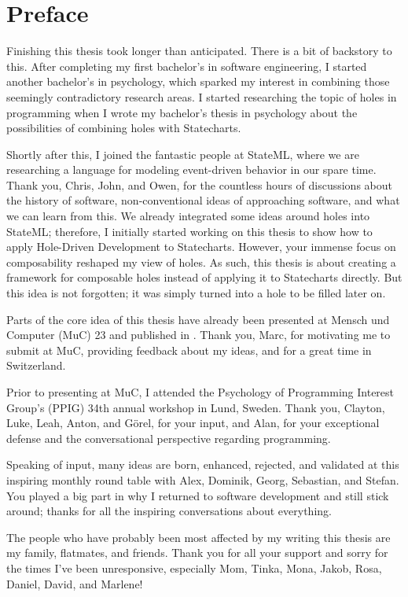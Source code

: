 \chapter{Preface}
Finishing this thesis took longer than anticipated.
There is a bit of backstory to this.
After completing my first bachelor's in software engineering, I started another bachelor's in psychology, which sparked my interest in combining those seemingly contradictory research areas.
I started researching the topic of holes in programming when I wrote my bachelor's thesis in psychology about the possibilities of combining holes with Statecharts.

Shortly after this, I joined the fantastic people at StateML, where we are researching a language for modeling event-driven behavior in our spare time.
Thank you, Chris, John, and Owen, for the countless hours of discussions about the history of software, non-conventional ideas of approaching software, and what we can learn from this.
We already integrated some ideas around holes into StateML; therefore, I initially started working on this thesis to show how to apply Hole-Driven Development to Statecharts.
However, your immense focus on composability reshaped my view of holes.
As such, this thesis is about creating a framework for composable holes instead of applying it to Statecharts directly.
But this idea is not forgotten; it was simply turned into a hole to be filled later on.

Parts of the core idea of this thesis have already been presented at Mensch und Computer (MuC) 23 and published in \cite{mayr_replacing_2023}.
Thank you, Marc, for motivating me to submit at MuC, providing feedback about my ideas, and for a great time in Switzerland.

Prior to presenting at MuC, I attended the Psychology of Programming Interest Group's (PPIG) 34th annual workshop in Lund, Sweden.
Thank you, Clayton, Luke, Leah, Anton, and Görel, for your input, and Alan, for your exceptional defense and the conversational perspective regarding programming.

Speaking of input, many ideas are born, enhanced, rejected, and validated at this inspiring monthly round table with Alex, Dominik, Georg, Sebastian, and Stefan.
You played a big part in why I returned to software development and still stick around; thanks for all the inspiring conversations about everything.

The people who have probably been most affected by my writing this thesis are my family, flatmates, and friends.
Thank you for all your support and sorry for the times I've been unresponsive, especially Mom, Tinka, Mona, Jakob, Rosa, Daniel, David, and Marlene!

